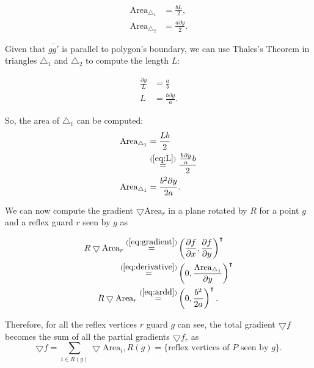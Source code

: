 \begin{align*}
    \text{Area}_{\triangle_1} &= \frac{b L}{2},\\ 
    \text{Area}_{\triangle_2} &= \frac{a \partial y}{2}.
\end{align*}


Given that $\overline{gg'}$ is parallel to polygon's boundary, we can use Thales's Theorem in triangles $\triangle_1$ and $\triangle_2$ to compute the length $L$: 

\begin{align}
    \frac{\partial y}{L} &= \frac a b \\
    L &= \frac{b \partial y}{a}. \label{eq:L}
\end{align}

So, the area of $\triangle_1$ can be computed:
\begin{align}
    \text{Area}_{\triangle_1} &= \frac{Lb}{2} \\
    &\overset{(\ref{eq:L})}{=} \frac{\frac{b \partial y}{a}b}{2} \\
    \text{Area}_{\triangle_1} &= \frac{b^2 \partial y}{2a}. \label{eq:ardd}
\end{align}

We can now compute the gradient $\bigtriangledown \text{Area}_r$ in a plane rotated by $R$ for a point $g$ and a reflex guard $r$ seen by $g$ as

\begin{align*}
    R\bigtriangledown \text{Area}_r \overset{(\ref{eq:gradient})}{=} &\left(\frac{\partial f}{\partial x}, \frac{\partial f}{\partial y}\right)^\intercal \\
    \overset{(\ref{eq:derivative})}{=} &\left(0, \frac{\text{Area}_{\triangle_1}}{\partial y}\right)^\intercal \\
    R\bigtriangledown \text{Area}_r \overset{(\ref{eq:ardd})}{=} &\left(0, \frac{b^2}{2a}\right)^\intercal.
\end{align*}


Therefore, for all the reflex vertices $r$ guard $g$ can see, the total gradient $\bigtriangledown f$ becomes the sum of all the partial gradients $\bigtriangledown f_r$ as $$\bigtriangledown f = \sum_{i \in R(g)} \bigtriangledown \text{Area}_i, R(g) = \{\text{reflex vertices of } P \text{ seen by }g\}.$$

